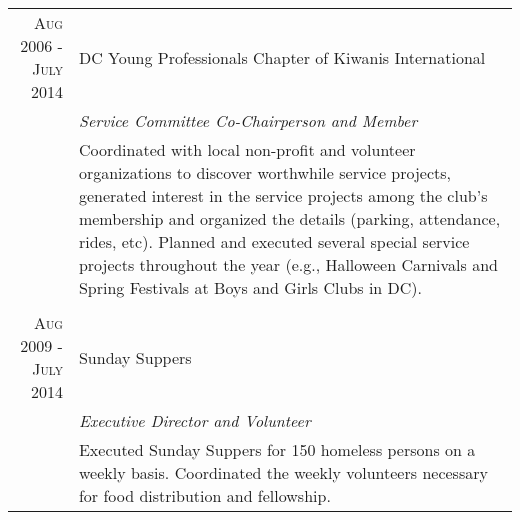 \documentclass[a4paper,10pt]{article} %
\begin{document}
\begin{tabular}{r|p{11cm}}
\textsc{Aug 2006 - July 2014} & DC Young Professionals Chapter of Kiwanis International\\
& \emph{Service Committee Co-Chairperson and Member} \\
& \footnotesize{Coordinated with local non-profit and volunteer organizations to discover worthwhile service projects, generated interest in the service projects among the club's membership and organized the details (parking, attendance, rides, etc). Planned and executed several special service projects throughout the year (e.g., Halloween Carnivals and Spring Festivals at Boys and Girls Clubs in DC). } \\
\multicolumn{2}{c}{} \\

\textsc{Aug 2009 - July 2014} & Sunday Suppers\\
& \emph{Executive Director and Volunteer} \\
& \footnotesize{Executed Sunday Suppers for 150 homeless persons on a weekly basis. Coordinated the weekly volunteers necessary for food distribution and fellowship.}
\end{tabular}



\nocite{*}

\end{document}
